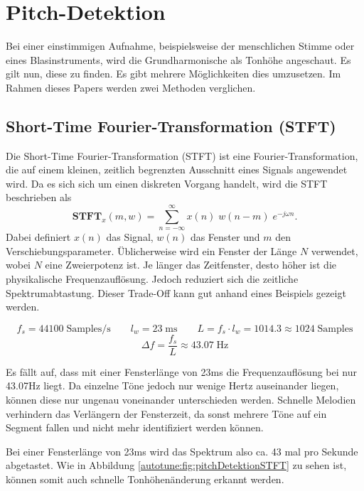 %
%
%
%
\section{Pitch-Detektion
\label{autotune:section:pitchDetektion}}
Bei einer einstimmigen Aufnahme, beispielsweise der menschlichen Stimme oder eines Blasinstruments,
wird die Grundharmonische als Tonhöhe angeschaut.
Es gilt nun, diese zu finden. Es gibt mehrere Möglichkeiten dies umzusetzen.
Im Rahmen dieses Papers werden zwei Methoden verglichen.

\subsection{Short-Time Fourier-Transformation (STFT)
\label{autotune:subsection:shortTimeFourierTransformation}}
Die Short-Time Fourier-Transformation (STFT) ist eine Fourier-Transformation, die auf einem kleinen,
zeitlich begrenzten Ausschnitt eines Signals angewendet wird.
Da es sich sich um einen diskreten Vorgang handelt, wird die STFT beschrieben als
\begin{equation}
    \mathbf{STFT}_x(m, w)
    =
    \sum_{n=-\infty}^{\infty}x(n)\;w(n-m)\;e^{-j\omega n}.
\end{equation}
Dabei definiert $x(n)$ das Signal, $w(n)$ das Fenster und $m$ den Verschiebungsparameter.
Üblicherweise wird ein Fenster der Länge $N$ verwendet, wobei $N$ eine Zweierpotenz ist.
Je länger das Zeitfenster, desto höher ist die physikalische Frequenzauflösung. Jedoch reduziert sich die zeitliche Spektrumabtastung.
Dieser Trade-Off kann gut anhand eines Beispiels gezeigt werden.

\[
    f_s = 44100\;\text{Samples/s} \quad\quad l_w = 23\;\text{ms} \quad\quad L = f_s \cdot l_w = 1014.3 \approx 1024\;\text{Samples}
\]
\[
    \Delta f = \frac{f_s}{L}\approx 43.07\;\text{Hz}
\]

Es fällt auf, dass mit einer Fensterlänge von 23\;ms die Frequenzauflösung bei nur 43.07\;Hz liegt.
Da einzelne Töne jedoch nur wenige Hertz auseinander liegen, können diese nur ungenau voneinander unterschieden werden.
Schnelle Melodien verhindern das Verlängern der Fensterzeit, da sonst mehrere Töne auf ein Segment fallen und nicht mehr identifiziert werden können.

Bei einer Fensterlänge von 23\;ms wird das Spektrum also ca. 43 mal pro Sekunde abgetastet.
Wie in Abbildung \ref{autotune:fig:pitchDetektionSTFT} zu sehen ist, können somit auch schnelle Tonhöhenänderung erkannt werden.

